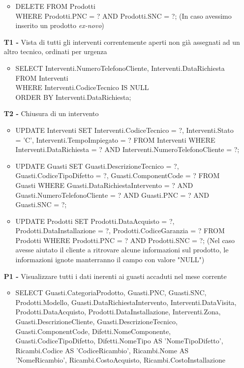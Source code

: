 \documentclass[a4paper, 12pt]{report}
\begin{document}
\begin{itemize}
\begin{itemize}[leftmargin=*, topsep=0pt]
			\item DELETE FROM Prodotti \\WHERE Prodotti.PNC = ? AND Prodotti.SNC = ?;
				\subitem (In caso avessimo inserito un prodotto \textit{ex-novo})			
		\end{itemize}
	\item[\textbf{T1 -}] Vista di tutti gli interventi correntemente aperti non già assegnati ad un altro tecnico, ordinati per urgenza
		\begin{itemize}[leftmargin=*, topsep=0pt]
			\item SELECT Interventi.NumeroTelefonoCliente, Interventi.DataRichiesta\\
			FROM Interventi\\
			WHERE Interventi.CodiceTecnico IS NULL\\
			ORDER BY Interventi.DataRichiesta;
		\end{itemize}
	\item[\textbf{T2 -}] Chiusura di un intervento
		\begin{itemize}[leftmargin=*, topsep=0pt]
			\item UPDATE Interventi SET Interventi.CodiceTecnico = ?, Interventi.Stato = 'C', Interventi.TempoImpiegato = ? FROM Interventi WHERE Interventi.DataRichiesta = ? AND Interventi.NumeroTelefonoCliente = ?;\newline
			\item UPDATE Guasti SET Guasti.DescrizioneTecnico = ?, Guasti.CodiceTipoDifetto = ?, Guasti.ComponentCode = ? FROM Guasti WHERE Guasti.DataRichiestaIntervento = ? AND Guasti.NumeroTelefonoCliente = ? AND Guasti.PNC = ? AND Guasti.SNC = ?;\newline
			\item UPDATE Prodotti SET Prodotti.DataAcquisto = ?, Prodotti.DataInstallazione = ?, Prodotti.CodiceGaranzia = ? FROM Prodotti WHERE Prodotti.PNC = ? AND Prodotti.SNC = ?;
				\subitem (Nel caso avesse aiutato il cliente a ritrovare alcune informazioni sul prodotto, le informazioni ignote manterranno il campo con valore "NULL")
		\end{itemize}
	\newpage
	\item[\textbf{P1 -}] Visualizzare tutti i dati inerenti ai guasti accaduti nel mese corrente
		\begin{itemize}[leftmargin=*, topsep=0pt]
			\item SELECT Guasti.CategoriaProdotto, Guasti.PNC, Guasti.SNC, Prodotti.Modello, Guasti.DataRichiestaIntervento, Interventi.DataVisita, Prodotti.DataAcquisto, Prodotti.DataInstallazione, Interventi.Zona, Guasti.DescrizioneCliente, Guasti.DescrizioneTecnico, Guasti.ComponentCode, Difetti.NomeComponente, Guasti.CodiceTipoDifetto, Difetti.NomeTipo AS 'NomeTipoDifetto', Ricambi.Codice AS 'CodiceRicambio', Ricambi.Nome AS 'NomeRicambio', Ricambi.CostoAcquisto, Ricambi.CostoInstallazione\\

\end{itemize}
\end{itemize}
\end{document}

